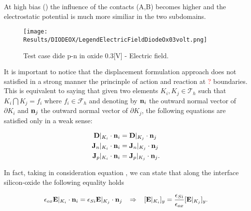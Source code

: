 At high bias () the influence of the contacts (A,B) becomes higher and the electrostatic potential is much more similiar in the two subdomains.


\vspace{1cm}

\begin{figure}[!h]
\centering
{}
\hspace{0.05\textwidth}
\hspace{0.04\textwidth}
{\texttt{[image: Results/DIODEOX/LegendElectricFieldDiodeOx03volt.png]}}
\caption{Test case dide p-n in oxide 0.3[V] - Electric field.}
\label{fig: electric field diode}
\end{figure}

\vspace{0.5cm}


It is important to notice that the displacement formulation approach does not satisfied  in a strong manner the princinple of action and reaction at \textcolor{red}{?} boundaries.
This is equivalent to saying that given two elements $K_i,K_j\in \mathcal{T}_h$ such that $K_i \bigcap K_j = f_i$ where $f_i \in \mathcal{F}_h$ and denoting by $\mathbf{n}_{i}$ the outward normal vector of $\partial K_i$ and $\mathbf{n}_{j}$ the outward normal vector of $\partial K_j$,  the following equations are satisfied only in a weak sense:

\begin{align}
\mathbf{D}|_{K_i}\cdot \mathbf{n}_{i} & = \mathbf{D}|_{K_j} \cdot \mathbf{n}_{j} \label{eq: conservazione vettore spostamento}\\
\mathbf{J}_n|_{K_i}\cdot \mathbf{n}_{i} & = \mathbf{J}_n|_{K_j}\cdot \mathbf{n}_{j} \\
\mathbf{J}_p|_{K_i}\cdot \mathbf{n}_{i} & = \mathbf{J}_p|_{K_j}\cdot \mathbf{n}_{j} .
\end{align}


In fact, taking in consideration equation , we can state that along the interface silicon-oxide the following equality holds

\begin{equation}
\label{eq: rapporto campi}
\epsilon_{ox}\vect{E}|_{K_i}\cdot \vect{n}_{i} = \epsilon_{Si}\vect{E}|_{K_j} \cdot \vect{n}_{j} \psp{5} \Rightarrow \psp{5}  [\vect{E}|_{K_i}]_y = \dfrac{\epsilon_{Si}}{\epsilon_{ox}}[\vect{E}|_{K_j}]_y.
\end{equation}  

